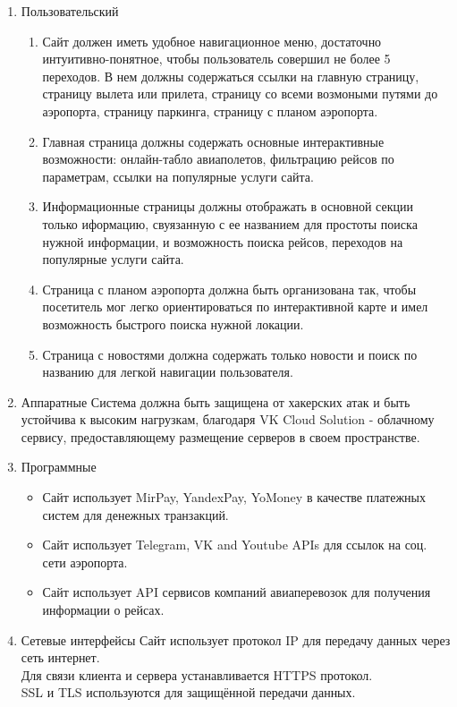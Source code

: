 
\begin{enumerate}
      \item Пользовательский
            \begin{enumerate}
                  \item Сайт должен иметь удобное навигационное меню,
                        достаточно интуитивно-понятное, чтобы пользователь совершил не более
                        5 переходов.
                        В нем должны содержаться ссылки на главную страницу, страницу вылета или прилета,
                        страницу со всеми возмоными путями до аэропорта,
                        страницу паркинга, страницу с планом аэропорта.
                  \item Главная страница должны содержать основные интерактивные возможности:
                        онлайн-табло авиаполетов, фильтрацию рейсов по параметрам,
                        ссылки на популярные услуги сайта.
                  \item Информационные страницы должны отображать в основной секции только иформацию,
                        свуязанную с ее названием для простоты поиска нужной информации,
                        и возможность поиска рейсов, переходов на популярные услуги сайта.
                  \item Страница с планом аэропорта должна быть организована так, чтобы
                        посетитель мог легко ориентироваться по интерактивной карте и имел возможность
                        быстрого поиска нужной локации.
                  \item Страница с новостями должна содержать только новости и
                        поиск по названию для легкой навигации пользователя.
            \end{enumerate}
      \item Аппаратные
            Система должна быть защищена от хакерских атак и быть устойчива к высоким нагрузкам, благодаря
            VK Cloud Solution - облачному сервису, предоставляющему размещение серверов в своем пространстве.
      \item Программные
            \begin{itemize}
                  \item Сайт использует MirPay, YandexPay, YoMoney в качестве платежных систем для денежных транзакций.
                  \item Сайт использует Telegram, VK and Youtube APIs для ссылок на соц. сети аэропорта.
                  \item Сайт использует API сервисов компаний авиаперевозок для получения информации о рейсах.
            \end{itemize}
      \item Сетевые интерфейсы
            Сайт использует протокол IP для передачу данных через сеть интернет.
            \\
            Для связи клиента и сервера устанавливается HTTPS протокол.
            \\
            SSL и TLS используются для защищённой передачи данных.
\end{enumerate}